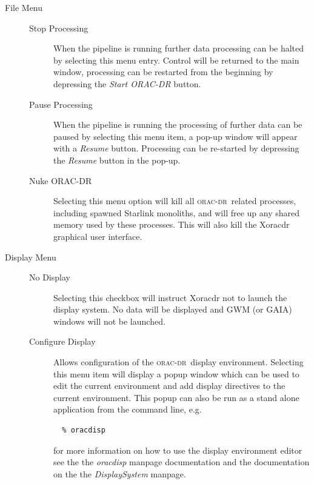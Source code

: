 \documentclass[twoside,11pt]{article}
\renewcommand{\_}{\texttt{\symbol{95}}}
\newcommand{\oracdr}{\textsc{orac-dr}}
\begin{document}
\begin{description}
\item[File Menu] \mbox{}\begin{description}
\item[Stop Processing] \mbox{}

When the pipeline is running further data processing can be halted by
selecting this menu entry. Control will be returned to the main
window, processing can be restarted from the beginning by depressing
the \textit{Start ORAC-DR} button.

\item[Pause Processing] \mbox{}

When the pipeline is running the processing of further data can be
paused by selecting this menu item, a pop-up window will appear with a
\textit{Resume} button. Processing can be re-started by depressing the
\textit{Resume} button in the pop-up.

\item[Nuke ORAC-DR] \mbox{}

Selecting this menu option will kill all \oracdr\ related processes,
including spawned Starlink monoliths, and will free up any shared
memory used by these processes. This will also kill the Xoracdr
graphical user interface.

\end{description}
\item[Display Menu] \mbox{}\begin{description}
\item[No Display] \mbox{}

Selecting this checkbox will instruct Xoracdr not to launch the
display system. No data will be displayed and GWM (or GAIA) windows
will not be launched.

\item[Configure Display] \mbox{}

Allows configuration of the \oracdr\ display environment. Selecting
this menu item will display a popup window which can be used to edit
the current environment and add display directives to the current
environment. This popup can also be run as a stand alone application
from the command line, e.g.

\begin{verbatim}
  % oracdisp
\end{verbatim}


for more information on how to use the display environment editor see
the the \emph{oracdisp} manpage documentation and the documentation on the
the \emph{DisplaySystem} manpage.


\end{description}
\end{description}
\end{document}

